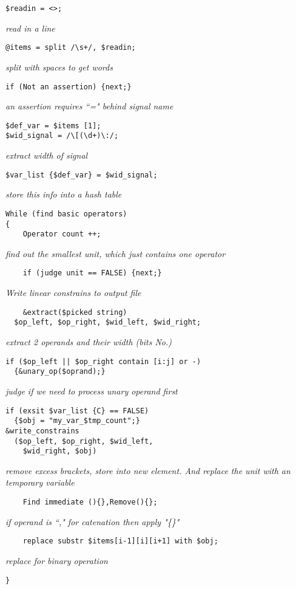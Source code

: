 \documentclass[conference,11pt]{IEEEtran}
\begin{document}
\begin{verbatim}
$readin = <>; 
\end{verbatim}
 \emph {read in a line}
\begin{verbatim}
@items = split /\s+/, $readin;  
\end{verbatim} 
\emph {split with spaces to get words}
\begin{verbatim}
if (Not an assertion) {next;}  
\end{verbatim} 
\emph {an assertion requires ``=" behind signal name}
\begin{verbatim}
$def_var = $items [1]; 
$wid_signal = /\[(\d+)\:/; \end{verbatim}  \emph {extract width of signal} \begin{verbatim} 
$var_list {$def_var} = $wid_signal;  \end{verbatim}  \emph {store this info into a hash table} \begin{verbatim} 
While (find basic operators)
{
    Operator count ++;
\end{verbatim}
\emph{find out the smallest unit, which just contains one operator}
\begin{verbatim}
	if (judge unit == FALSE) {next;}
\end{verbatim}
	\emph{Write linear constrains to output file}
\begin{verbatim}
    &extract($picked string) 
  $op_left, $op_right, $wid_left, $wid_right;  \end{verbatim}  \emph {extract 2 operands and their width (bits No.)} \begin{verbatim} 
if ($op_left || $op_right contain [i:j] or -) 
  {&unary_op($oprand);}  \end{verbatim}  \emph { judge if we need to process unary operand first } \begin{verbatim}
if (exsit $var_list {C} == FALSE) 
  {$obj = "my_var_$tmp_count";} 
&write_constrains 
  ($op_left, $op_right, $wid_left, 
	$wid_right, $obj) 
\end{verbatim}
\emph{remove excess brackets, store into new element. And replace the unit with an temporary variable}
\begin{verbatim}
    Find immediate (){},Remove(){};  \end{verbatim}  \emph {if operand is ``," for catenation then apply "\{\}" } \begin{verbatim} 
	replace substr $items[i-1][i][i+1] with $obj;  \end{verbatim}  \emph { replace for binary operation } \begin{verbatim}
}
\end{verbatim}
\end{document}
